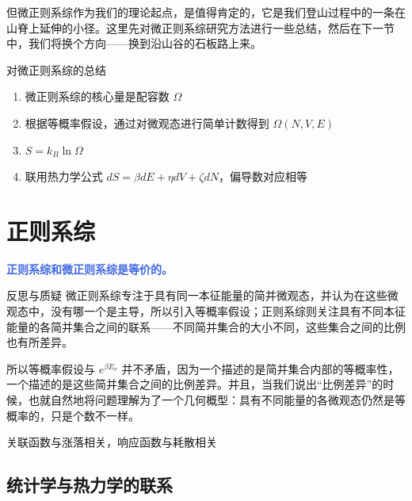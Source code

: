 \documentclass[hyperref,UTF-8]{ctexart}
\newcommand{\0}{\boldsymbol{0}}
\begin{document}
但微正则系综作为我们的理论起点，是值得肯定的，它是我们登山过程中的一条在山脊上延伸的小径。这里先对微正则系综研究方法进行一些总结，然后在下一节中，我们将换个方向——换到沿山谷的石板路上来。

\begin{understanding}{\kaishu 对微正则系综的总结}
\kaishu \fontsize{11pt}{16pt}
    \begin{enumerate}
        \item 微正则系综的核心量是配容数 $\Omega$
        \item 根据等概率假设，通过对微观态进行简单计数得到 $\Omega(N,V,E)$
        \item $S = k_B \ln \Omega$
        \item 联用热力学公式 $dS = \beta dE + \eta dV + \zeta dN$，偏导数对应相等
    \end{enumerate}

\end{understanding}

\section{正则系综}
\textcolor{RoyalBlue}{\textbf{\kaishu 正则系综和微正则系综是等价的。}}

\begin{justification}{反思与质疑}
\kaishu \fontsize{11pt}{16pt}
    \quad\quad 微正则系综专注于具有同一本征能量的简并微观态，并认为在这些微观态中，没有哪一个是主导，所以引入等概率假设；正则系综则关注具有不同本征能量的各简并集合之间的联系——不同简并集合的大小不同，这些集合之间的比例也有所差异。

    \quad\quad 所以等概率假设与 $e^{\beta E_\nu}$ 并不矛盾，因为一个描述的是简并集合内部的等概率性，一个描述的是这些简并集合之间的比例差异。并且，当我们说出“比例差异”的时候，也就自然地将问题理解为了一个几何概型：具有不同能量的各微观态仍然是等概率的，只是个数不一样。
\end{justification}

\textcolor{RoyalBlue}{\textbf{\kaishu }}


关联函数与涨落相关，响应函数与耗散相关



\subsection{统计学与热力学的联系}



    
    
    
    


\end{document}
